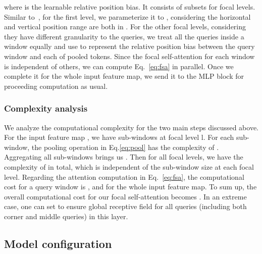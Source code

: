 \documentclass{article}
\begin{document}
where  is the learnable relative position bias. It consists of  subsets for  focal levels. Similar to~\cite{liu2021swin}, for the first level, we parameterize it to , considering the horizontal and vertical position range are both in . For the other focal levels, considering they have different granularity to the queries, we treat all the queries inside a window equally and use  to represent the relative position bias between the query window and each of  pooled tokens. Since the focal self-attention for each window is independent of others, we can compute Eq.~\eqref{eq:fsa} in parallel. Once we complete it for the whole input feature map, we send it to the MLP block for proceeding computation as usual.

\subsubsection{Complexity analysis}

We analyze the computational complexity for the two main steps discussed above. For the input feature map , we have  sub-windows at focal level l. For each sub-window, the pooling operation in Eq.\ref{eq:pool} has the complexity of . Aggregating all sub-windows brings us . Then for all focal levels, we have the complexity of  in total, which is independent of the sub-window size at each focal level. Regarding the attention computation in Eq.~\ref{eq:fsa}, the computational cost for a query window  is , and  for the whole input feature map. To sum up, the overall computational cost for our focal self-attention becomes . In an extreme case, one can set  to ensure global receptive field for all queries (including both corner and middle queries) in this layer. 












\subsection{Model configuration}
\end{document}
